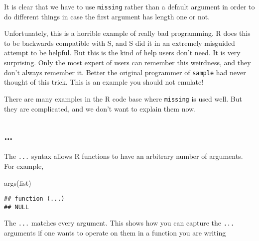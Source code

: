 \documentclass[
]{article}
\newenvironment{Shaded}{\begin{snugshade}}{\end{snugshade}}
\newcommand{\AttributeTok}[1]{\textcolor[rgb]{0.77,0.63,0.00}{#1}}
\newcommand{\ControlFlowTok}[1]{\textcolor[rgb]{0.13,0.29,0.53}{\textbf{#1}}}
\newcommand{\FunctionTok}[1]{\textcolor[rgb]{0.00,0.00,0.00}{#1}}
\newcommand{\NormalTok}[1]{#1}
\newcommand{\OtherTok}[1]{\textcolor[rgb]{0.56,0.35,0.01}{#1}}
\newcommand{\SpecialCharTok}[1]{\textcolor[rgb]{0.00,0.00,0.00}{#1}}
\newcommand{\StringTok}[1]{\textcolor[rgb]{0.31,0.60,0.02}{#1}}
\begin{document}
It is clear that we have to use \texttt{missing} rather than a default
argument in order to do different things in case the first argument has
length one or not.

Unfortunately, this is a horrible example of really bad programming. R
does this to be backwards compatible with S, and S did it in an
extremely misguided attempt to be helpful. But this is the kind of help
users don't need. It is very surprising. Only the most expert of users
can remember this weirdness, and they don't always remember it. Better
the original programmer of \texttt{sample} had never thought of this
trick. This is an example you should not emulate!

There are many examples in the R code base where \texttt{missing} is
used well. But they are complicated, and we don't want to explain them
now.

\hypertarget{section}{%
\subsection{\ldots{}}\label{section}}

The \texttt{...} syntax allows R functions to have an arbitrary number
of arguments. For example,

\begin{Shaded}
\begin{Highlighting}[]
\FunctionTok{args}\NormalTok{(list)}
\end{Highlighting}
\end{Shaded}

\begin{verbatim}
## function (...) 
## NULL
\end{verbatim}

The \texttt{...} matches every argument. This shows how you can capture
the \texttt{...} arguments if one wants to operate on them in a function
you are writing

\begin{Shaded}
\end{Shaded}
\end{document}
